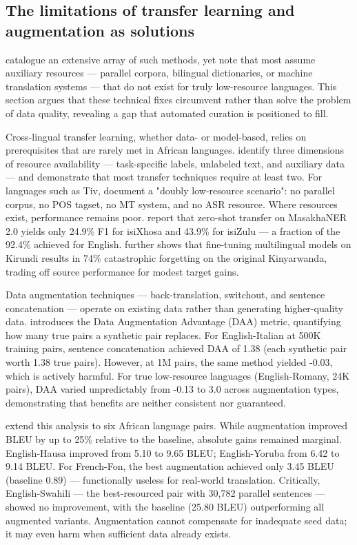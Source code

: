 \documentclass[11pt,a4paper]{article}
\begin{document}
\subsection{The limitations of transfer learning and augmentation as solutions}
\citet{hedderich2021survey} catalogue an extensive array of such methods, yet note that most assume auxiliary resources — parallel corpora, bilingual dictionaries, or machine translation systems — that do not exist for truly low-resource languages. This section argues that these technical fixes circumvent rather than solve the problem of data quality, revealing a gap that automated curation is positioned to fill. 

Cross-lingual transfer learning, whether data- or model-based, relies on prerequisites that are rarely met in African languages. \citet{hedderich2021survey} identify three dimensions of resource availability — task-specific labels, unlabeled text, and auxiliary data — and demonstrate that most transfer techniques require at least two. For languages such as Tiv, \citet{achir2026preservation} document a "doubly low-resource scenario": no parallel corpus, no POS tagset, no MT system, and no ASR resource. Where resources exist, performance remains poor. \citet{garcia2025cross} report that zero-shot transfer on MasakhaNER 2.0 yields only 24.9\% F1 for isiXhosa and 43.9\% for isiZulu — a fraction of the 92.4\% achieved for English. \citet{thangaraj2024cross} further shows that fine-tuning multilingual models on Kirundi results in 74\% catastrophic forgetting on the original Kinyarwanda, trading off source performance for modest target gains.

Data augmentation techniques — back-translation, switchout, and sentence concatenation — operate on existing data rather than generating higher-quality data. \citet{lamar2023measuring} introduces the Data Augmentation Advantage (DAA) metric, quantifying how many true pairs a synthetic pair replaces. For English-Italian at 500K training pairs, sentence concatenation achieved DAA of 1.38 (each synthetic pair worth 1.38 true pairs). However, at 1M pairs, the same method yielded -0.03, which is actively harmful. For true low-resource languages (English-Romany, 24K pairs), DAA varied unpredictably from -0.13 to 3.0 across augmentation types, demonstrating that benefits are neither consistent nor guaranteed.

\citet{oduwole2025scarcity} extend this analysis to six African language pairs. While augmentation improved BLEU by up to 25\% relative to the baseline, absolute gains remained marginal. English-Hausa improved from 5.10 to 9.65 BLEU; English-Yoruba from 6.42 to 9.14 BLEU. For French-Fon, the best augmentation achieved only 3.45 BLEU (baseline 0.89) — functionally useless for real-world translation. Critically, English-Swahili — the best-resourced pair with 30,782 parallel sentences — showed no improvement, with the baseline (25.80 BLEU) outperforming all augmented variants. Augmentation cannot compensate for inadequate seed data; it may even harm when sufficient data already exists.
\end{document}
